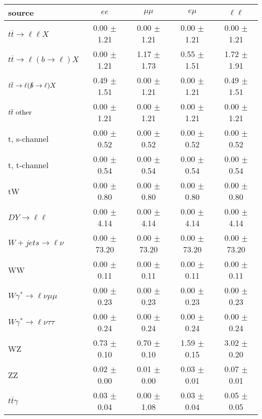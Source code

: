 \begin{tabular}{l|cccc} \hline\hline
source & $ee$ & $\mu\mu$ & $e\mu$ & $\ell\ell $ \\
\hline
$t\overline{t} \rightarrow \ell \ell X$ &  0.00 $\pm$  1.21 &  0.00 $\pm$  1.21 &  0.00 $\pm$  1.21 &  0.00 $\pm$  1.21 \\
$t\overline{t} \rightarrow \ell (b \rightarrow \ell) X$ &  0.00 $\pm$  1.21 &  1.17 $\pm$  1.73 &  0.55 $\pm$  1.51 &  1.72 $\pm$  1.91 \\
$t\overline{t} \rightarrow \ell (\slashed b \rightarrow \ell) X$ &  0.49 $\pm$  1.51 &  0.00 $\pm$  1.21 &  0.00 $\pm$  1.21 &  0.49 $\pm$  1.51 \\
        $t\overline{t}\ \rm{other}$ &  0.00 $\pm$  1.21 &  0.00 $\pm$  1.21 &  0.00 $\pm$  1.21 &  0.00 $\pm$  1.21 \\
\hline
                       t, s-channel &  0.00 $\pm$  0.52 &  0.00 $\pm$  0.52 &  0.00 $\pm$  0.52 &  0.00 $\pm$  0.52 \\
                       t, t-channel &  0.00 $\pm$  0.54 &  0.00 $\pm$  0.54 &  0.00 $\pm$  0.54 &  0.00 $\pm$  0.54 \\
                                 tW &  0.00 $\pm$  0.80 &  0.00 $\pm$  0.80 &  0.00 $\pm$  0.80 &  0.00 $\pm$  0.80 \\
\hline
         $DY \rightarrow \ell \ell$ &  0.00 $\pm$  4.14 &  0.00 $\pm$  4.14 &  0.00 $\pm$  4.14 &  0.00 $\pm$  4.14 \\
      $W+jets \rightarrow \ell \nu$ &  0.00 $\pm$ 73.20 &  0.00 $\pm$ 73.20 &  0.00 $\pm$ 73.20 &  0.00 $\pm$ 73.20 \\
                                 WW &  0.00 $\pm$  0.11 &  0.00 $\pm$  0.11 &  0.00 $\pm$  0.11 &  0.00 $\pm$  0.11 \\
\hline
$W\gamma^{*} \rightarrow \ell \nu \mu\mu$ &  0.00 $\pm$  0.23 &  0.00 $\pm$  0.23 &  0.00 $\pm$  0.23 &  0.00 $\pm$  0.23 \\
$W\gamma^{*} \rightarrow \ell \nu \tau\tau$ &  0.00 $\pm$  0.24 &  0.00 $\pm$  0.24 &  0.00 $\pm$  0.24 &  0.00 $\pm$  0.24 \\
                                 WZ &  0.73 $\pm$  0.10 &  0.70 $\pm$  0.10 &  1.59 $\pm$  0.15 &  3.02 $\pm$  0.20 \\
                                 ZZ &  0.02 $\pm$  0.00 &  0.01 $\pm$  0.00 &  0.03 $\pm$  0.01 &  0.07 $\pm$  0.01 \\
\hline
              $t\overline{t}\gamma$ &  0.03 $\pm$  0.04 &  0.00 $\pm$  1.08 &  0.03 $\pm$  0.04 &  0.05 $\pm$  0.05 \\

\end{tabular}
